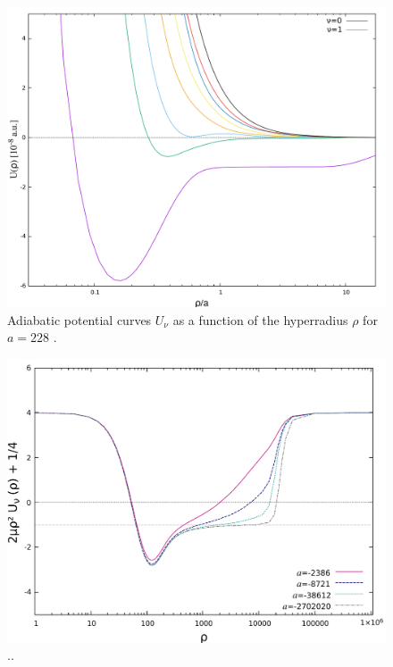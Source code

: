 \begin{figure}
	\includegraphics[width=\linewidth]{adiabatic.pdf}
	\caption{Adiabatic potential curves $U_{\nu}$ as a function of the hyperradius $\rho$ for $a=228 $ .}
	\label{fig:3}
\end{figure}

\begin{figure}
	\includegraphics[width=\linewidth]{plotneg_dashed.pdf}
	\caption{..}
	\label{fig:5}
\end{figure}

